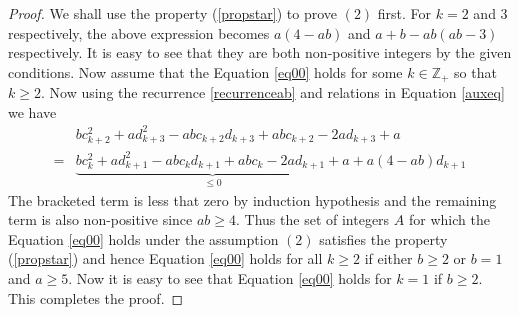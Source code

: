 \documentclass[12pt,reqno]{amsart}
\theoremstyle{plain}
\theoremstyle{definition}
\theoremstyle{remark}
\newcommand\bz{\mathbb Z}
\begin{document}
\begin{proof}
    We shall use the property (\ref{propstar}) to prove $(2)$ first.
    For $k=2$ and $3$ respectively, the above expression becomes $a(4-ab)$ and $a+b-ab(ab-3)$ 
    respectively. It is easy to see that they are both non-positive integers by the given conditions. Now assume that the Equation \ref{eq00} holds for some $k\in\bz_+$ so that $k\geq 2.$ Now using the recurrence \ref{recurrenceab} and relations in Equation \ref{auxeq} we have 
    \begin{align*}
        &bc_{k+2}^2+ad_{k+3}^2-abc_{k+2}d_{k+3}+abc_{k+2}-2ad_{k+3}+a\\
        =& \underbrace{bc_k^2+ad_{k+1}^2-abc_kd_{k+1}+abc_{k}-2ad_{k+1}+a}_{\le 0}+a(4-ab)d_{k+1}
    \end{align*}
    The bracketed term is less that zero by induction hypothesis and the remaining term is also non-positive since $ab\geq 4.$ Thus the set of integers $A$ for which the Equation \ref{eq00} holds under the assumption $(2)$ satisfies the property (\ref{propstar}) and hence Equation \ref{eq00} holds for all $k\geq 2$ if either $b\geq 2$ or $b=1$ and $a\geq 5$. Now it is easy to see that Equation \ref{eq00} holds for $k=1$ if $b\geq 2.$ This completes the proof. 
\end{proof}
\end{document}

